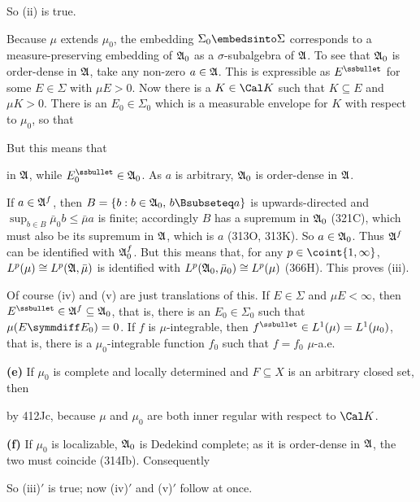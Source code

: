 {\noindent So (ii) is true.

Because $\mu$ extends $\mu_0$, the embedding $\Sigma_0\embedsinto\Sigma$
corresponds to a measure-preserving embedding of $\frak A_0$ as a
$\sigma$-subalgebra of $\frak A$.   To see that $\frak A_0$ is
order-dense in $\frak A$, take any
non-zero $a\in\frak A$.   This is expressible as $E^{\ssbullet}$ for some
$E\in\Sigma$ with $\mu E>0$.   Now there is a $K\in\Cal K$ such that
$K\subseteq E$ and $\mu K>0$.   There is an $E_0\in\Sigma_0$ which is a
measurable envelope for $K$ with respect to $\mu_0$, so that


\noindent But this means that


\noindent in $\frak A$, while $E_0^{\ssbullet}\in\frak A_0$.   As $a$ is
arbitrary, $\frak A_0$ is order-dense in $\frak A$.

If $a\in\frak A^f$, then $B=\{b:b\in\frak A_0,\,b\Bsubseteq a\}$ is
upwards-directed and $\sup_{b\in B}\bar\mu_0b\le\bar\mu a$ is finite;
accordingly $B$ has a supremum in $\frak A_0$ (321C), which must also be
its supremum in
$\frak A$, which is $a$ (313O, 313K).   So $a\in\frak A_0$.   Thus
$\frak A^f$ can be identified with $\frak A_0^f$.   But this means that,
for any $p\in\coint{1,\infty}$, $L^p(\mu)\cong L^p(\frak A,\bar\mu)$ is
identified
with $L^p(\frak A_0,\bar\mu_0)\cong L^p(\mu)$ (366H).   This proves
(iii).

Of course (iv) and (v) are just translations of this.   If $E\in\Sigma$
and $\mu E<\infty$, then $E^{\ssbullet}\in\frak A^f\subseteq\frak A_0$,
that is, there is an $E_0\in\Sigma_0$ such that $\mu(E\symmdiff E_0)=0$.
If $f$ is $\mu$-integrable, then $f^{\ssbullet}\in L^1(\mu)=L^1(\mu_0)$,
that is, there is a $\mu_0$-integrable function $f_0$ such that
$f=f_0\,\,\mu$-a.e.

\medskip

{\bf (e)} If $\mu_0$ is complete and locally determined and
$F\subseteq X$ is an arbitrary closed set, then


\noindent by 412Jc, because $\mu$ and $\mu_0$ are both inner regular
with respect to $\Cal K$.

\medskip

{\bf (f)} If $\mu_0$ is localizable, $\frak A_0$ is Dedekind complete;
as it is order-dense in $\frak A$, the two must coincide (314Ib).
Consequently


\noindent So (iii)$'$ is true;  now (iv)$'$ and (v)$'$ follow at once.
}%


